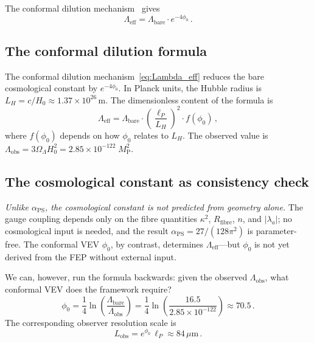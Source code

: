 \documentclass[12pt, a4paper]{article}
\theoremstyle{definition}
\theoremstyle{remark}
\newcommand{\MP}{M_{\mathrm{P}}}
\newcommand{\aPS}{\alpha_{\mathrm{PS}}}
\newcommand{\Lobs}{L_{\mathrm{obs}}}
\newcommand{\Rfibre}{R_{\mathrm{fibre}}}
\begin{document}
The conformal dilution mechanism~\cite{Paper1} gives
\begin{equation}
\label{eq:Lambda_eff}
\Lambda_{\mathrm{eff}} = \Lambda_{\mathrm{bare}} \cdot e^{-4\phi_0}\,.
\end{equation}

\subsection{The conformal dilution formula}

The conformal dilution mechanism~\eqref{eq:Lambda_eff} reduces the bare cosmological constant by $e^{-4\phi_0}$.
In Planck units, the Hubble radius is $L_H = c/H_0 \approx 1.37 \times 10^{26}\,\mathrm{m}$.
The dimensionless content of the formula is
\begin{equation}
\label{eq:Lambda_dimless}
\Lambda_{\mathrm{eff}} = \Lambda_{\mathrm{bare}} \cdot \left(\frac{\ell_P}{L_H}\right)^2 \cdot f(\phi_0)\,,
\end{equation}
where $f(\phi_0)$ depends on how $\phi_0$ relates to $L_H$.
The observed value is $\Lambda_{\mathrm{obs}} = 3\Omega_\Lambda H_0^2 = 2.85 \times 10^{-122}\; \MP^2$.

\subsection{The cosmological constant as consistency check}

\emph{Unlike $\aPS$, the cosmological constant is not predicted from geometry alone.}
The gauge coupling depends only on the fibre quantities $\kappa^2$, $\Rfibre$, $n$, and $|\lambda_a|$; no cosmological input is needed, and the result $\aPS = 27/(128\pi^2)$ is parameter-free.
The conformal VEV $\phi_0$, by contrast, determines $\Lambda_{\mathrm{eff}}$---but $\phi_0$ is not yet derived from the FEP without external input.

We can, however, run the formula backwards: given the observed $\Lambda_{\mathrm{obs}}$, what conformal VEV does the framework require?
\begin{equation}
\phi_0 = \frac{1}{4}\ln\!\left(\frac{\Lambda_{\mathrm{bare}}}{\Lambda_{\mathrm{obs}}}\right) = \frac{1}{4}\ln\!\left(\frac{16.5}{2.85 \times 10^{-122}}\right) \approx 70.5\,.
\end{equation}
The corresponding observer resolution scale is
\begin{equation}
\label{eq:Lobs}
\Lobs = e^{\phi_0}\, \ell_P \approx 84\,\mu\mathrm{m}\,.
\end{equation}
\end{document}
